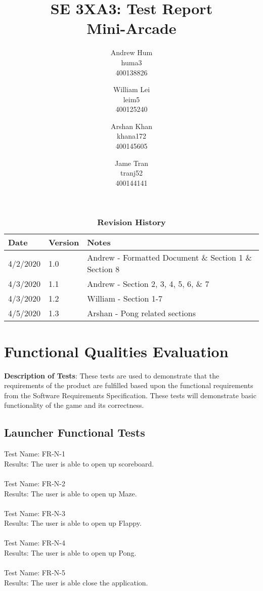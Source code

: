 \documentclass[12pt, titlepage]{article}
\title{SE 3XA3: Test Report\\Mini-Arcade}
\author{Andrew Hum \\ huma3 \\ 400138826 \and
		William Lei \\ leim5 \\ 400125240 \and
		Arshan Khan \\ khana172 \\ 400145605 \and
		Jame Tran \\ tranj52 \\ 400144141
}
\date{}
\begin{document}
\maketitle
\newpage
\tableofcontents
\listoftables
\listoffigures

\begin{table}[!hbp]
\caption{\bf Revision History}
\begin{tabularx}{\textwidth}{p{3cm}p{2cm}X}
\toprule {\bf Date} & {\bf Version} & {\bf Notes} \\
\midrule
4/2/2020 & 1.0 & Andrew - Formatted Document \& Section 1 \& Section 8\\
4/3/2020 & 1.1 & Andrew - Section 2, 3, 4, 5, 6, \& 7 \\
4/3/2020 & 1.2 & William - Section 1-7 \\ 
4/5/2020 & 1.3 & Arshan - Pong related sections\\
\bottomrule
\end{tabularx}
\end{table}

\newpage

\section{Functional Qualities Evaluation}

\textbf{Description of Tests}: These tests are used to demonstrate that the requirements of the product are fulfilled based upon the functional requirements from the Software Requirements Specification. These tests will demonstrate basic functionality of the game and its correctness. \\
	
\subsection{Launcher Functional Tests}
	Test Name: FR-N-1\\
	Results: The user is able to open up scoreboard.\\ \\
	Test Name: FR-N-2\\
	Results: The user is able to open up Maze.\\ \\
	Test Name: FR-N-3\\
	Results: The user is able to open up Flappy.\\ \\
	Test Name: FR-N-4\\
	Results: The user is able to open up Pong.\\ \\
	Test Name: FR-N-5\\
	Results: The user is able close the application.\\
\end{document}
